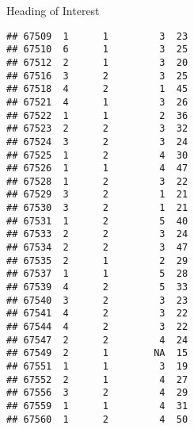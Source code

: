 \documentclass[
  ignorenonframetext,
]{beamer}
\begin{document}
\begin{frame}[fragile]{Heading of Interest}
\begin{verbatim}
## 67509  1      1         3  23
## 67510  6      1         3  25
## 67512  2      1         3  20
## 67516  3      2         3  25
## 67518  4      2         1  45
## 67521  4      1         3  26
## 67522  1      1         2  36
## 67523  2      2         3  32
## 67524  3      2         3  24
## 67525  1      2         4  30
## 67526  1      1         4  47
## 67528  1      2         3  22
## 67529  3      2         1  21
## 67530  3      2         1  21
## 67531  1      2         5  40
## 67533  2      2         3  24
## 67534  2      2         3  47
## 67535  2      1         2  29
## 67537  1      1         5  28
## 67539  4      2         5  33
## 67540  3      2         3  23
## 67541  4      2         3  22
## 67544  4      2         3  22
## 67547  2      2         4  24
## 67549  2      1        NA  15
## 67551  1      1         3  19
## 67552  2      1         4  27
## 67556  3      2         4  29
## 67559  1      1         4  31
## 67560  1      2         4  50
\end{verbatim}
\end{frame}
\end{document}
